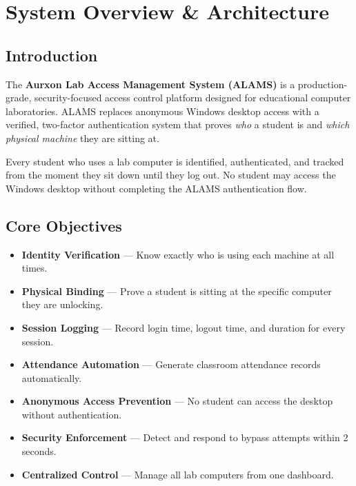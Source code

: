 \chapter{System Overview \& Architecture}
\label{ch:overview}

\section{Introduction}

The \textbf{Aurxon Lab Access Management System (ALAMS)} is a production-grade, security-focused access control platform designed for educational computer laboratories. ALAMS replaces anonymous Windows desktop access with a verified, two-factor authentication system that proves \emph{who} a student is and \emph{which physical machine} they are sitting at.

\begin{tcolorbox}[alamsbox, title={\faInfoCircle\quad System Purpose}]
Every student who uses a lab computer is identified, authenticated, and tracked from the moment they sit down until they log out. No student may access the Windows desktop without completing the ALAMS authentication flow.
\end{tcolorbox}

\section{Core Objectives}

\begin{itemize}[leftmargin=*, label={\textcolor{aurxonblue}{\faArrowRight}}]
  \item \textbf{Identity Verification} — Know exactly who is using each machine at all times.
  \item \textbf{Physical Binding} — Prove a student is sitting at the specific computer they are unlocking.
  \item \textbf{Session Logging} — Record login time, logout time, and duration for every session.
  \item \textbf{Attendance Automation} — Generate classroom attendance records automatically.
  \item \textbf{Anonymous Access Prevention} — No student can access the desktop without authentication.
  \item \textbf{Security Enforcement} — Detect and respond to bypass attempts within 2 seconds.
  \item \textbf{Centralized Control} — Manage all lab computers from one dashboard.
\end{itemize}

